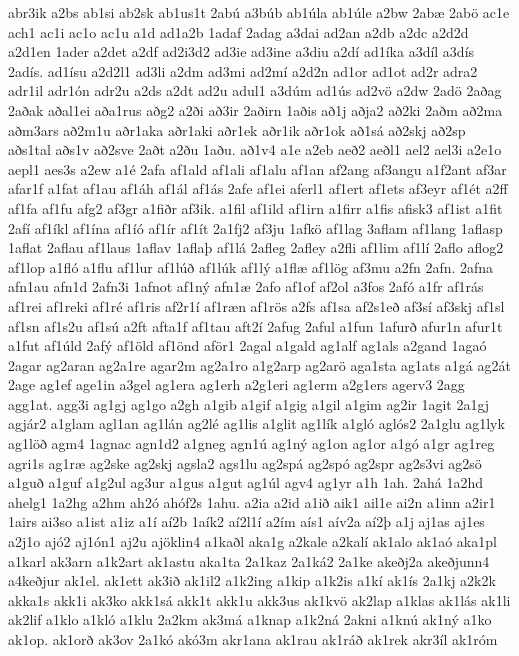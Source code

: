 {abr3ik
a2bs
ab1si
ab2sk
ab1us1t
2abú
a3búb
ab1úla
ab1úle
a2bw
2abæ
2abö
ac1e
ach1
ac1i
ac1o
ac1u
a1d
ad1a2b
1adaf
2adag
a3dai
ad2an
a2db
a2dc
a2d2d
a2d1en
1ader
a2det
a2df
ad2i3d2
ad3ie
ad3ine
a3diu
a2dí
ad1íka
a3díl
a3dís
2adís.
ad1ísu
a2d2l1
ad3li
a2dm
ad3mi
ad2mí
a2d2n
ad1or
ad1ot
ad2r
adra2
adr1il
adr1ón
adr2u
a2ds
a2dt
ad2u
adul1
a3dúm
ad1ús
ad2vö
a2dw
2adö
2aðag
2aðak
aðal1ei
aða1rus
aðg2
a2ði
að3ir
2aðirn
1aðis
að1j
aðja2
að2ki
2aðm
að2ma
aðm3ars
að2m1u
aðr1aka
aðr1aki
aðr1ek
aðr1ik
aðr1ok
að1sá
að2skj
að2sp
aðs1tal
aðs1v
að2sve
2aðt
a2ðu
1aðu.
að1v4
a1e
a2eb
aeð2
aeðl1
ael2
ael3i
a2e1o
aepl1
aes3s
a2ew
a1é
2afa
af1ald
af1ali
af1alu
af1an
af2ang
af3angu
a1f2ant
af3ar
afar1f
a1fat
af1au
af1áh
af1ál
af1ás
2afe
af1ei
aferl1
af1ert
af1ets
af3eyr
af1ét
a2ff
af1fa
af1fu
afg2
af3gr
a1fiðr
af3ik.
a1fil
af1ild
af1irn
a1firr
a1fis
afisk3
af1ist
a1fit
2afí
af1íkl
af1ína
af1íó
af1ír
af1ít
2a1fj2
af3ju
1afkö
af1lag
3aflam
af1lang
1aflasp
1aflat
2aflau
af1laus
1aflav
1aflaþ
af1lá
2afleg
2afley
a2fli
af1lim
af1lí
2aflo
aflog2
af1lop
a1fló
a1flu
af1lur
af1lúð
af1lúk
af1lý
a1flæ
af1lög
af3mu
a2fn
2afn.
2afna
afn1au
afn1d
2afn3i
1afnot
af1ný
afn1æ
2afo
af1of
af2ol
a3fos
2afó
a1fr
af1rás
af1rei
af1reki
af1ré
af1ris
af2r1í
af1ræn
af1rös
a2fs
af1sa
af2s1eð
af3sí
af3skj
af1sl
af1sn
af1s2u
af1sú
a2ft
afta1f
af1tau
aft2í
2afug
2aful
a1fun
1afurð
afur1n
afur1t
a1fut
af1úld
2afý
af1öld
af1önd
aför1
2agal
a1gald
ag1alf
ag1als
a2gand
1agaó
2agar
ag2aran
ag2a1re
agar2m
ag2a1ro
a1g2arp
ag2arö
aga1sta
ag1ats
a1gá
ag2át
2age
ag1ef
age1in
a3gel
ag1era
ag1erh
a2g1eri
ag1erm
a2g1ers
agerv3
2agg
agg1at.
agg3i
ag1gj
ag1go
a2gh
a1gib
a1gif
a1gig
a1gil
a1gim
ag2ir
1agit
2a1gj
agjár2
a1glam
agl1an
ag1lán
ag2lé
ag1lis
a1glit
ag1lík
a1gló
aglós2
2a1glu
ag1lyk
ag1löð
agm4
1agnac
agn1d2
a1gneg
agn1ú
ag1ný
ag1on
ag1or
a1gó
a1gr
ag1reg
agri1s
ag1ræ
ag2ske
ag2skj
agsla2
ags1lu
ag2spá
ag2spó
ag2spr
ag2s3vi
ag2sö
a1guð
a1guf
a1g2ul
ag3ur
a1gus
a1gut
ag1úl
agv4
ag1yr
a1h
1ah.
2ahá
1a2hd
ahelg1
1a2hg
a2hm
ah2ó
ahóf2s
1ahu.
a2ia
a2id
a1ið
aik1
ail1e
ai2n
a1inn
a2ir1
1airs
ai3so
a1ist
a1iz
a1í
aí2b
1aík2
aí2l1í
a2ím
aís1
aív2a
aí2þ
a1j
aj1as
aj1es
a2j1o
ajó2
aj1ón1
aj2u
ajöklin4
a1kaðl
aka1g
a2kale
a2kalí
ak1alo
ak1aó
aka1pl
a1karl
ak3arn
a1k2art
ak1astu
aka1ta
2a1kaz
2a1ká2
2a1ke
akeðj2a
akeðjunn4
a4keðjur
ak1el.
ak1ett
ak3ið
ak1il2
a1k2ing
a1kip
a1k2is
a1kí
ak1ís
2a1kj
a2k2k
akka1s
akk1i
ak3ko
akk1sá
akk1t
akk1u
akk3us
ak1kvö
ak2lap
a1klas
ak1lás
ak1li
ak2lif
a1klo
a1kló
a1klu
2a2km
ak3má
a1knap
a1k2ná
2akni
a1knú
ak1ný
a1ko
ak1op.
ak1orð
ak3ov
2a1kó
akó3m
akr1ana
ak1rau
ak1ráð
ak1rek
akr3íl
ak1róm
}
